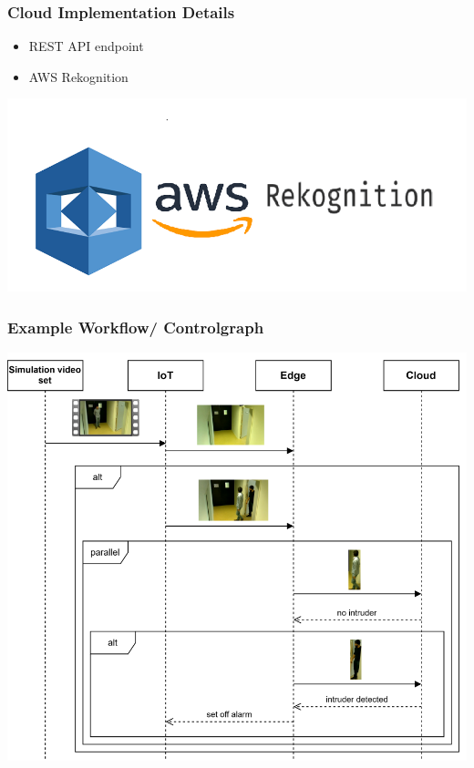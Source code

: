 \documentclass{beamer}
\begin{document}
\begin{frame}
\frametitle{Cloud Implementation Details}
    \begin{itemize}
        \item REST API endpoint
        \item AWS Rekognition
    \end{itemize}
    \begin{center}
        \includegraphics[width=0.7\linewidth]{./res/rekognition.png}
    \end{center}



\end{frame}


\begin{frame}
    \begin{center}
        \frametitle{Example Workflow/ Controlgraph}
        \includegraphics[width=0.7\linewidth]{./res/sequenz_diagram.png}
    \end{center}
\end{frame}
\end{document}
